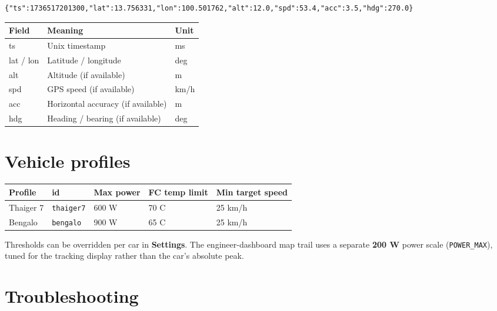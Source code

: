 \documentclass[11pt,a4paper,oneside]{report}
\newcommand{\degC}{\textdegree C}
\newcommand{\code}[1]{\texttt{#1}}
\begin{document}
\begin{lstlisting}
{"ts":1736517201300,"lat":13.756331,"lon":100.501762,"alt":12.0,"spd":53.4,"acc":3.5,"hdg":270.0}
\end{lstlisting}

\begin{tabularx}{\linewidth}{@{}lLl@{}}
\toprule
\textbf{Field} & \textbf{Meaning} & \textbf{Unit}\\
\midrule
ts & Unix timestamp & ms\\
lat / lon & Latitude / longitude & deg\\
alt & Altitude (if available) & m\\
spd & GPS speed (if available) & km/h\\
acc & Horizontal accuracy (if available) & m\\
hdg & Heading / bearing (if available) & deg\\
\bottomrule
\end{tabularx}

\section{Vehicle profiles}

\begin{tabularx}{\linewidth}{@{}llllL@{}}
\toprule
\textbf{Profile} & \textbf{id} & \textbf{Max power} & \textbf{FC temp limit} & \textbf{Min target speed}\\
\midrule
Thaiger 7 & \code{thaiger7} & 600 W & 70 \degC{} & 25 km/h\\
Bengalo   & \code{bengalo}  & 900 W & 65 \degC{} & 25 km/h\\
\bottomrule
\end{tabularx}

\medskip
Thresholds can be overridden per car in \textbf{Settings}. The engineer-dashboard
map trail uses a separate \textbf{200 W} power scale (\code{POWER\_MAX}), tuned for
the tracking display rather than the car's absolute peak.

\section{Troubleshooting}
\end{document}

